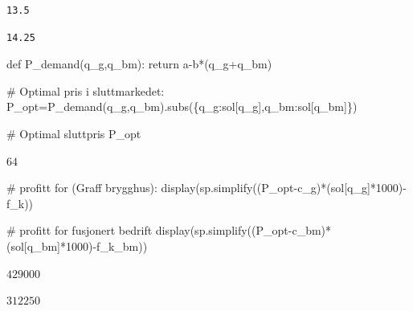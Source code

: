 \documentclass[
  12pt,
  a4paper,
  DIV=11,
  numbers=noendperiod]{scrartcl}
\newenvironment{Shaded}{\begin{snugshade}}{\end{snugshade}}
\newcommand{\CommentTok}[1]{\textcolor[rgb]{0.37,0.37,0.37}{#1}}
\newcommand{\ControlFlowTok}[1]{\textcolor[rgb]{0.00,0.23,0.31}{#1}}
\newcommand{\DecValTok}[1]{\textcolor[rgb]{0.68,0.00,0.00}{#1}}
\newcommand{\KeywordTok}[1]{\textcolor[rgb]{0.00,0.23,0.31}{#1}}
\newcommand{\NormalTok}[1]{\textcolor[rgb]{0.00,0.23,0.31}{#1}}
\newcommand{\OperatorTok}[1]{\textcolor[rgb]{0.37,0.37,0.37}{#1}}
\begin{document}
\begin{verbatim}
13.5
\end{verbatim}

\begin{verbatim}
14.25
\end{verbatim}

\begin{Shaded}
\begin{Highlighting}[]
\KeywordTok{def}\NormalTok{ P\_demand(q\_g,q\_bm):}
    \ControlFlowTok{return}\NormalTok{ a}\OperatorTok{{-}}\NormalTok{b}\OperatorTok{*}\NormalTok{(q\_g}\OperatorTok{+}\NormalTok{q\_bm)}

\CommentTok{\# Optimal pris i sluttmarkedet:}
\NormalTok{P\_opt}\OperatorTok{=}\NormalTok{P\_demand(q\_g,q\_bm).subs(\{q\_g:sol[q\_g],q\_bm:sol[q\_bm]\})}

\CommentTok{\# Optimal sluttpris }
\NormalTok{P\_opt}
\end{Highlighting}
\end{Shaded}

$\displaystyle 64$

\begin{Shaded}
\begin{Highlighting}[]
\CommentTok{\# profitt for (Graff brygghus):}
\NormalTok{display(sp.simplify((P\_opt}\OperatorTok{{-}}\NormalTok{c\_g)}\OperatorTok{*}\NormalTok{(sol[q\_g]}\OperatorTok{*}\DecValTok{1000}\NormalTok{)}\OperatorTok{{-}}\NormalTok{f\_k))}

\CommentTok{\# profitt for fusjonert bedrift}
\NormalTok{display(sp.simplify((P\_opt}\OperatorTok{{-}}\NormalTok{c\_bm)}\OperatorTok{*}\NormalTok{(sol[q\_bm]}\OperatorTok{*}\DecValTok{1000}\NormalTok{)}\OperatorTok{{-}}\NormalTok{f\_k\_bm))}
\end{Highlighting}
\end{Shaded}

$\displaystyle 429000$

$\displaystyle 312250$
\end{document}
